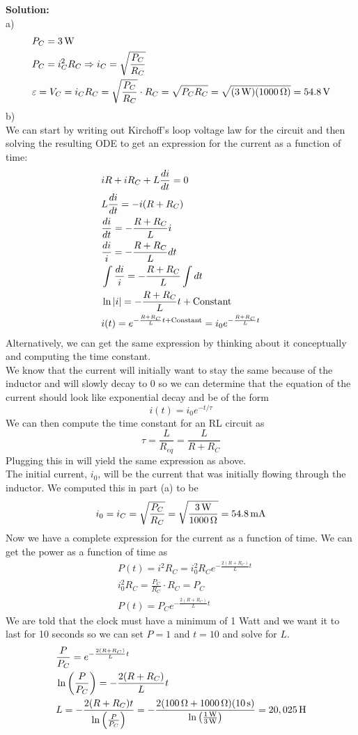 \documentclass[11pt, fleqn]{article}
\begin{document}
\textbf{Solution:}\\
a)
\begin{align*}
    &P_C=3\units{W}\\
    &P_C=i_C^2R_C\Ra i_C=\sqrt{\frac{P_C}{R_C}}\\
    &\varepsilon=V_C=i_CR_C=\sqrt{\frac{P_C}{R_C}}\cdot R_C=\sqrt{P_CR_C}=\sqrt{(3\units{W})(1000\units{\Omega})}=54.8\units{V}
\end{align*}
b)\\
We can start by writing out Kirchoff's loop voltage law for the circuit and then solving the resulting ODE to get an expression for the current as a function of time:
\begin{align*}
    &iR+iR_C+L\ddx[i]{t}=0\\
    &L\ddx[i]{t}=-i(R+R_C)\\
    &\ddx[i]{t}=-\frac{R+R_C}{L}i\\
    &\frac{di}{i}=-\frac{R+R_C}{L}dt\\
    &\int\frac{di}{i}=-\frac{R+R_C}{L}\int dt\\
    &\ln|i|=-\frac{R+R_C}{L}t+\text{Constant}\\
    &i(t)=e^{-\frac{R+R_C}{L}t+\text{Constant}}=i_0e^{-\frac{R+R_C}{L}t}
\end{align*}
Alternatively, we can get the same expression by thinking about it conceptually and computing the time constant.\\
We know that the current will initially want to stay the same because of the inductor and will slowly decay to 0 so we can determine that the equation of the current should look like exponential decay and be of the form
\[i(t)=i_0e^{-t/\tau}\]
We can then compute the time constant for an RL circuit as
\[\tau=\frac{L}{R_{eq}}=\frac{L}{R+R_C}\]
Plugging this in will yield the same expression as above.\\
The initial current, $i_0$, will be the current that was initially flowing through the inductor. We computed this in part (a) to be
\[i_0=i_C=\sqrt{\frac{P_C}{R_C}}=\sqrt{\frac{3\units{W}}{1000\units{\Omega}}}=54.8\units{mA}\]
Now we have a complete expression for the current as a function of time. We can get the power as a function of time as
\begin{align*}
    &P(t)=i^2R_C=i_0^2R_Ce^{-\frac{2(R+R_C)}{L}t}\\
    &i_0^2R_C=\frac{P_C}{R_C}\cdot R_C=P_C\\
    &P(t)=P_Ce^{-\frac{2(R+R_C)}{L}t}
\end{align*}
We are told that the clock must have a minimum of 1 Watt and we want it to last for 10 seconds so we can set $P=1$ and $t=10$ and solve for $L$.
\begin{align*}
    &\frac{P}{P_C}=e^{-\frac{2(R+R_C)}{L}t}\\
    &\ln\bfrac{P}{P_C}=-\frac{2(R+R_C)}{L}t\\
    &L=-\frac{2(R+R_C)t}{\ln\bfrac{P}{P_C}}=-\frac{2(100\units{\Omega}+1000\units{\Omega})(10\units{s})}{\ln\bfrac{1\units{W}}{3\units{W}}}=20,025\units{H}
\end{align*}
\end{document}
